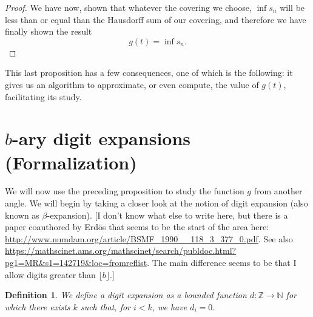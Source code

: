 \documentclass[11pt, reqno]{amsart}
\newcommand{\Z}{\mathbb{Z}}
\newcommand{\N}{\mathbb{N}}
\newtheorem{definition}{Definition}
\begin{document}
\begin{proof}
We have now, shown that whatever the covering we choose, $\inf s_n$ will be less than or equal than the Hausdorff sum of our covering, and therefore we have finally shown the result
\[ g(t) = \inf s_n.\]

\iffalse
Now, to show we can assume all intervals to be disjoint: fix any point $a$ in $\cup I_i$. Define $J_a$ to be \emph{the biggest interval in $A$ containing $a$}. We propose, now, that the covering $A' = \{ J_a \}$ covers exactly the same points as $A$, while having a Hausdorff sum less than or equal to that of $A$, as well as having all its intervals be disjoint.

The first two properties are trivial, so we devote our attention only to the third one: suppose, for the sake of argument, that $J_a$ and $J_b$ are not disjoint. The structure of the $b$-ary intervals mandates that either $J_a \subseteq J_b$ or $J_b \subseteq J_a$; suppose the former for the sake of argument. Then, $a \in J_b$, which implies $J_a$ is of length greater than or equal to that of $J_b$ (by definition), and so, in fact, $J_a = J_b$.

This digression completed, we may go back to the problem at hand.
\fi
\end{proof}

This last proposition has a few consequences, one of which is the following: it gives us an algorithm to approximate, or even compute, the value of $g(t)$, facilitating its study.

\section{$b$-ary digit expansions (Formalization)}\label{sec7}

We will now use the preceding proposition to study the function $g$ from another angle. We will begin by taking a closer look at the notion of digit expansion (also known as $\beta$-expansion). [I don't know what else to write here, but there is a paper coauthored by Erdös that seems to be the start of the area here: \url{http://www.numdam.org/article/BSMF_1990__118_3_377_0.pdf}. See also \url{https://mathscinet.ams.org/mathscinet/search/publdoc.html?pg1=MR&s1=142719&loc=fromreflist}. The main difference seems to be that I allow digits greater than $\lfloor b \rfloor$.]

\begin{definition}
We define a \emph{digit expansion} as a \emph{bounded} function $d : \Z \to \N$ for which
there exists $k$ such that, for $i < k$, we have $d_i = 0$.

\end{definition}
\end{document}
